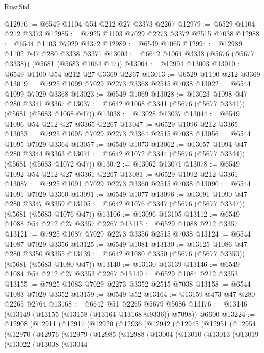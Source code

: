 \begin{lexlean}{RustStd}
\begin{coremodule}
@12976 := @6549 @1104 @54 @212 @27 @3373 @2267
@12979 := @6529 @1104 @212 @3373
@12985 := @7925 @1103 @7029 @2273 @3372 @2515 @7038
@12988 := @6544 @1103 @7029 @3372
@12989 := @6549 @1065
@12994 := @12989 @1102 @47 @280 @3338 @3371
@13003 := @6642 @1064 @3338 (@5676 (@5677 @3338)) (@5681 (@5683 @1064 @47))
@13004 := @12994 @13003
@13010 := @6549 @1100 @54 @212 @27 @3369 @2267
@13013 := @6529 @1100 @212 @3369
@13019 := @7925 @1099 @7029 @2273 @3368 @2515 @7038
@13022 := @6544 @1099 @7029 @3368
@13023 := @6549 @1069
@13028 := @13023 @1098 @47 @280 @3341 @3367
@13037 := @6642 @1068 @3341 (@5676 (@5677 @3341)) (@5681 (@5683 @1068 @47))
@13038 := @13028 @13037
@13044 := @6549 @1096 @54 @212 @27 @3365 @2267
@13047 := @6529 @1096 @212 @3365
@13053 := @7925 @1095 @7029 @2273 @3364 @2515 @7038
@13056 := @6544 @1095 @7029 @3364
@13057 := @6549 @1073
@13062 := @13057 @1094 @47 @280 @3344 @3363
@13071 := @6642 @1072 @3344 (@5676 (@5677 @3344)) (@5681 (@5683 @1072 @47))
@13072 := @13062 @13071
@13078 := @6549 @1092 @54 @212 @27 @3361 @2267
@13081 := @6529 @1092 @212 @3361
@13087 := @7925 @1091 @7029 @2273 @3360 @2515 @7038
@13090 := @6544 @1091 @7029 @3360
@13091 := @6549 @1077
@13096 := @13091 @1090 @47 @280 @3347 @3359
@13105 := @6642 @1076 @3347 (@5676 (@5677 @3347)) (@5681 (@5683 @1076 @47))
@13106 := @13096 @13105
@13112 := @6549 @1088 @54 @212 @27 @3357 @2267
@13115 := @6529 @1088 @212 @3357
@13121 := @7925 @1087 @7029 @2273 @3356 @2515 @7038
@13124 := @6544 @1087 @7029 @3356
@13125 := @6549 @1081
@13130 := @13125 @1086 @47 @280 @3350 @3355
@13139 := @6642 @1080 @3350 (@5676 (@5677 @3350)) (@5681 (@5683 @1080 @47))
@13140 := @13130 @13139
@13146 := @6549 @1084 @54 @212 @27 @3353 @2267
@13149 := @6529 @1084 @212 @3353
@13155 := @7925 @1083 @7029 @2273 @3352 @2515 @7038
@13158 := @6544 @1083 @7029 @3352
@13159 := @6549 @52
@13164 := @13159 @473 @47 @280 @2265 @2764
@13168 := @6642 @51 @2265 @5679 @5686
@13176 := @13146 (@13149 (@13155 (@13158 (@13164 @13168 @9336)) @7098)) @6600
@13224 := @12908
    (@12911
      (@12917
        (@12920
          (@12936
            (@12942
              (@12945
                (@12951
                  (@12954
                    (@12970
                      (@12976
                        (@12979
                          (@12985
                            (@12988
                              (@13004
                                (@13010
                                  (@13013
                                    (@13019
                                      (@13022
                                        (@13038
                                          (@13044

\end{coremodule}
\end{lexlean}
